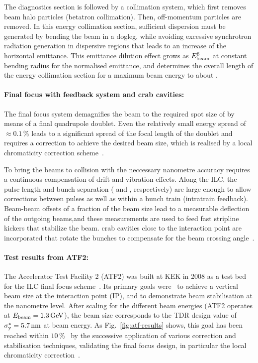 The diagnostics section is followed by a collimation system, which first removes beam halo particles (betatron collimation). 
Then, off-momentum particles are removed.
In this energy collimation section, sufficient dispersion must be generated by bending the beam in a dogleg, while avoiding excessive synchrotron radiation generation in dispersive regions that leads to an increase of the horizontal emittance.
This emittance dilution effect grows as $E_{\mathrm{beam}}^6$ at constant bending radius for the normalised emittance, and determines the overall length of the energy collimation section for a maximum  beam energy to about .


\paragraph {Final focus with feedback system and crab cavities:}

The final focus system demagnifies the beam to the required spot size of  by means of a final quadrupole doublet.
Even the relatively small energy spread of $\approx 0.1\,\%$ leads to a significant spread of the focal length of the doublet and requires a correction to achieve the desired beam size, which is realised by a local chromaticity correction scheme~\cite{Raimondi:2000cx}.

To bring the beams to collision with the neccessary nanometre accuracy requires a continuous compensation of drift and vibration effects.
Along the ILC, the pulse length and bunch separation ( and , respectively) are large enough to allow corrections between pulses as well as within a bunch train (intratrain feedback).
Beam-beam offsets of a fraction of the beam size lead to a measurable deflection of the outgoing beams,and these measurements are used to feed fast stripline kickers that stabilize the beam.
 crab cavities close to the interaction point are incorporated that rotate the bunches to compensate for the  beam crossing angle~\cite[Sect. 8.9]{Adolphsen:2013kya}.
 

\paragraph {Test results from ATF2:}
The Accelerator Test Facility 2 (ATF2) was built at KEK in 2008 as a test bed for the ILC final focus scheme~\cite[Sec. 3.6]{Adolphsen:2013jya}.
Its primary goals were~\cite{Grishanov:2005ek,Grishanov:2006kx} to achieve a  vertical beam size at the interaction point (IP), and to demonstrate beam stabilisation at the nanometre level.
After scaling for the different beam energies (ATF2 operates at $E_{\mathrm{beam}}=1.3\,{\mathrm{GeV}}$), the  beam size corresponds to the TDR design value of $\sigma_{\mathrm{y}}^* = 5.7\,{\mathrm{nm}}$ at  beam energy.
As Fig.~\ref{fig:atf-results} shows, this goal has been reached within $10\,\%$~\cite{Okugi:2017jji} by the successive application of various correction and stabilisation techniques, 
validating the final focus design, in particular the local chromaticity correction~\cite{White:2014vwa}.

